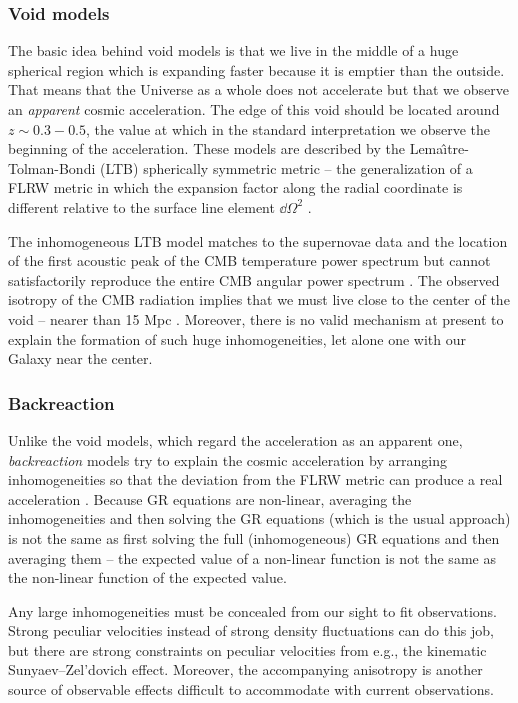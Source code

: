 \subsubsection{Void models}
The basic idea behind void models is that we live in the middle of a huge spherical region which is expanding faster because it is emptier than the outside. That means that the Universe as a whole does not accelerate but that we observe an \textit{apparent} cosmic acceleration. The edge of this void should be located around $z\sim0.3-0.5$, the value at which in the standard interpretation we observe the beginning of the acceleration. These models are described by the Lema\^\i tre-Tolman-Bondi (LTB) spherically symmetric metric -- the generalization of a FLRW metric in which the expansion factor along the radial coordinate is different relative to the surface line element $\dd\Omega^2$ \parencite{2013JCAP...02..047D,2006PhRvD..73h3519A}.

The inhomogeneous LTB model matches to the supernovae data and the location of the first acoustic peak of the CMB temperature power spectrum but cannot satisfactorily reproduce the entire CMB angular power spectrum \parencite{2011JCAP...02..013C}. The observed isotropy of the CMB radiation implies that we must live close to the center of the void -- nearer than 15 Mpc \parencite{2006PhRvD..74j3520A}. Moreover, there is no valid mechanism at present to explain the formation of such huge inhomogeneities, let alone one with our Galaxy near the center.
\subsubsection{Backreaction}
Unlike the void models, which regard the acceleration as an apparent one, \textit{backreaction} models try to explain the cosmic acceleration by arranging inhomogeneities so that the deviation from the FLRW metric can produce a real acceleration \parencite{2011CQGra..28w5002S,2004JCAP...02..003R,2005PhRvD..72b3507M}. Because GR equations are non-linear, averaging the inhomogeneities and then solving the GR equations (which is the usual approach) is not the same as first solving the full (inhomogeneous) GR equations and then averaging them -- the expected value of a non-linear function is not the same as the non-linear function of the expected value.

Any large inhomogeneities must be concealed from our sight to fit observations. Strong peculiar velocities instead of strong density fluctuations can do this job, but there are strong constraints on peculiar velocities from e.g., the kinematic Sunyaev--Zel'dovich effect. Moreover, the accompanying anisotropy is another source of observable effects difficult to accommodate with current observations.

